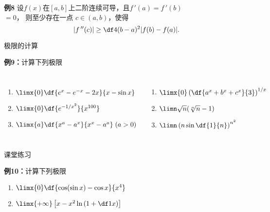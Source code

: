 \begin{frame}
	\linespread{1.5}
	\begin{exampleblock}{{\bf 例8}\hfill }
		设$f(x)$在$[a,b]$上二阶连续可导，且$f\,'(a)=f\,'(b)$\\ $=0$，
		则至少存在一点
		$c\in(a,b)$，使得
		$$|f\,''(c)|\geq \df 4{(b-a)^2}|f(b)-f(a)|.$$
	\end{exampleblock}
\end{frame}

\begin{frame}{极限的计算}
	\linespread{1.2}
	\begin{exampleblock}{{\bf 例9：}计算下列极限\hfill}
		\begin{columns}\pause 
				\begin{enumerate}
				  \item $\limx{0}\df{e^x-e^{-x}-2x}{x-\sin x}$\pause 
				  \item $\limx{0}\df{e^{-1/x^2}}{x^{100}}$\pause 
				  \item $\limx{a}\df{x^a-a^x}{x^x-a^a}\;(a>0)$\pause 
				\end{enumerate}	
				\begin{enumerate}
				  \addtocounter{enumi}{3}
				  \item $\limx{0}\left(\df{a^x+b^x+c^x}{3}\right)^{1/x}$\pause 
				  \item $\limn\sqrt{n}(\sqrt[n]{n}-1)$\pause 
				  \item $\limn\left(n\sin\df{1}{n}\right)^{n^2}$
				\end{enumerate}	
		\end{columns}
	\end{exampleblock}
\end{frame}

\begin{frame}{课堂练习}
	\linespread{2}
	\begin{exampleblock}{{\bf 例10：}计算下列极限\hfill}
		\begin{enumerate}
		  \item $\limx{0}\df{\cos(\sin x)-\cos x}{x^4}$
		  \item $\limx{+\infty}\left[x-x^2\ln\left(1+\df 1x\right)\right]$
		\end{enumerate}
	\end{exampleblock}
\end{frame}



